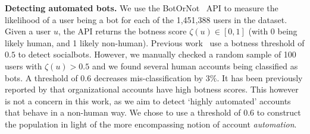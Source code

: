 \textbf{Detecting automated bots.}
We use the BotOrNot~\cite{davisetal.16} API to measure the likelihood of a user being a bot for each of the 1,451,388 users in the \debate dataset.
Given a user $u$, the API returns the botness score $\zeta(u) \in [0, 1]$ (with 0 being likely human, and 1 likely non-human).
Previous work~\cite{varol.17,FM7090,Woolley.2017} use a botness threshold of $0.5$ to detect socialbots.
However, we manually checked a random sample of 100 users with $\zeta(u) > 0.5$ and we found several human accounts being classified as bots.
A threshold of 0.6 decreases mis-classification by $3\%$.
It has been previously reported by \citet{varol.17} that organizational accounts have high botness scores.
This however is not a concern in this work, as we aim to detect 
`highly automated' accounts that behave in a non-human way. 
We chose to use a threshold of $0.6$ to construct the \Bot population in light of the more encompassing notion of account \emph{automation}. 

